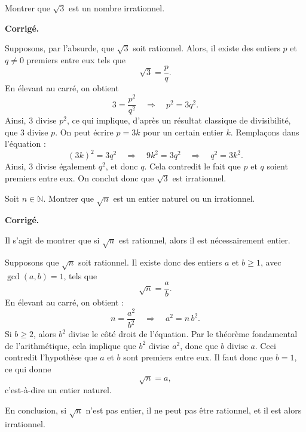 \documentclass[a4paper,11pt]{article}
\newenvironment{corrige}[1][Corrigé]{%
  \par\noindent\textbf{#1.}%
  \begin{itshape}}%
  {\end{itshape}\par}
\begin{document}
\begin{exercice}[title=Exercice 22 $\quad \star\star \quad$ { [Raisonner] }]{}{}
Montrer que $\sqrt{3}$ est un nombre irrationnel.
\end{exercice}

\begin{corrige}
Supposons, par l'absurde, que $\sqrt{3}$ soit rationnel. Alors, il existe des entiers $p$ et $q\neq 0$ premiers entre eux tels que
\[
\sqrt{3} = \frac{p}{q}.
\]
En élevant au carré, on obtient
\[
3 = \frac{p^2}{q^2} \quad \Longrightarrow \quad p^2 = 3q^2.
\]
Ainsi, $3$ divise $p^2$, ce qui implique, d'après un résultat classique de divisibilité, que $3$ divise $p$. On peut écrire $p=3k$ pour un certain entier $k$. Remplaçons dans l'équation :
\[
(3k)^2 = 3q^2 \quad \Longrightarrow \quad 9k^2 = 3q^2 \quad \Longrightarrow \quad q^2 = 3k^2.
\]
Ainsi, $3$ divise également $q^2$, et donc $q$. Cela contredit le fait que $p$ et $q$ soient premiers entre eux. On conclut donc que $\sqrt{3}$ est irrationnel.
\end{corrige}

\begin{exercice}[title=Exercice 23 $\quad \star\star\star \quad$ { [Chercher, Raisonner, Communiquer] }]{}{}
Soit $n \in \mathbb{N}$. Montrer que $\sqrt{n}$ est un entier naturel ou un irrationnel.
\end{exercice}

\begin{corrige}
Il s'agit de montrer que si $\sqrt{n}$ est rationnel, alors il est nécessairement entier.

Supposons que $\sqrt{n}$ soit rationnel. Il existe donc des entiers $a$ et $b\ge 1$, avec $\gcd(a,b)=1$, tels que
\[
\sqrt{n} = \frac{a}{b}.
\]
En élevant au carré, on obtient :
\[
n = \frac{a^2}{b^2} \quad \Longrightarrow \quad a^2 = n\, b^2.
\]
Si $b\ge 2$, alors $b^2$ divise le côté droit de l'équation. Par le théorème fondamental de l'arithmétique, cela implique que $b^2$ divise $a^2$, donc que $b$ divise $a$. Ceci contredit l'hypothèse que $a$ et $b$ sont premiers entre eux. Il faut donc que $b=1$, ce qui donne
\[
\sqrt{n} = a,
\]
c'est-à-dire un entier naturel.

En conclusion, si $\sqrt{n}$ n'est pas entier, il ne peut pas être rationnel, et il est alors irrationnel.
\end{corrige}
\end{document}
